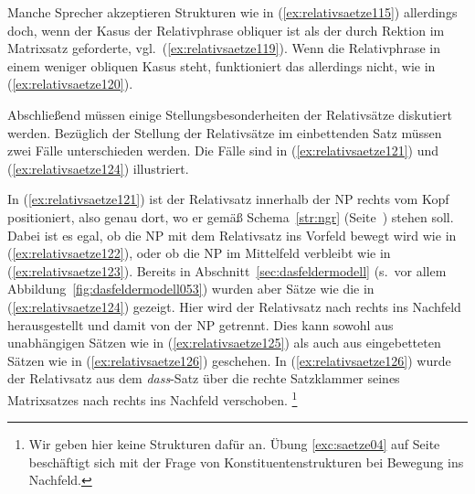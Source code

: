 Manche Sprecher akzeptieren Strukturen wie in (\ref{ex:relativsaetze115}) allerdings doch, wenn der Kasus der Relativphrase obliquer ist als der durch Rektion im Matrixsatz geforderte, vgl.\ (\ref{ex:relativsaetze119}).
Wenn die Relativphrase in einem weniger obliquen Kasus steht, funktioniert das allerdings nicht, wie in (\ref{ex:relativsaetze120}).

\Stretch[0.25]

\begin{exe}
  \ex\label{ex:relativsaetze118}
  \begin{xlist}
  \end{xlist}
\end{exe}

\Stretch[0.25]

Abschließend müssen einige Stellungsbesonderheiten der Relativsätze diskutiert werden.
Bezüglich der Stellung der Relativsätze im einbettenden Satz müssen zwei Fälle unterschieden werden.
Die Fälle sind in (\ref{ex:relativsaetze121}) und (\ref{ex:relativsaetze124}) illustriert.

\Stretch[0.25]

\begin{exe}
  \ex\label{ex:relativsaetze121}
  \begin{xlist}
  \end{xlist}
  \ex\label{ex:relativsaetze124}
  \begin{xlist}
  \end{xlist}
\end{exe}

\Stretch[0.25]

In (\ref{ex:relativsaetze121}) ist der Relativsatz innerhalb der NP rechts vom Kopf positioniert, also genau dort, wo er gemäß Schema~\ref{str:ngr} (Seite~\pageref{str:ngr}) stehen soll.
Dabei ist es egal, ob die NP mit dem Relativsatz ins Vorfeld bewegt wird wie in (\ref{ex:relativsaetze122}), oder ob die NP im Mittelfeld verbleibt wie in (\ref{ex:relativsaetze123}).
Bereits in Abschnitt~\ref{sec:dasfeldermodell} (s.\ vor allem Abbildung~\ref{fig:dasfeldermodell053}) wurden aber Sätze wie die in (\ref{ex:relativsaetze124}) gezeigt.
Hier wird der Relativsatz nach rechts ins Nachfeld herausgestellt und damit von der NP getrennt.
Dies kann sowohl aus unabhängigen Sätzen wie in (\ref{ex:relativsaetze125}) als auch aus eingebetteten Sätzen wie in (\ref{ex:relativsaetze126}) geschehen.
In (\ref{ex:relativsaetze126}) wurde der Relativsatz aus dem \textit{dass}-Satz über die rechte Satzklammer seines Matrixsatzes nach rechts ins Nachfeld verschoben.%
\footnote{Wir geben hier keine Strukturen dafür an.
Übung \ref{exc:saetze04} auf Seite~\pageref{exc:saetze04} beschäftigt sich mit der Frage von Konstituentenstrukturen bei Bewegung ins Nachfeld.}

